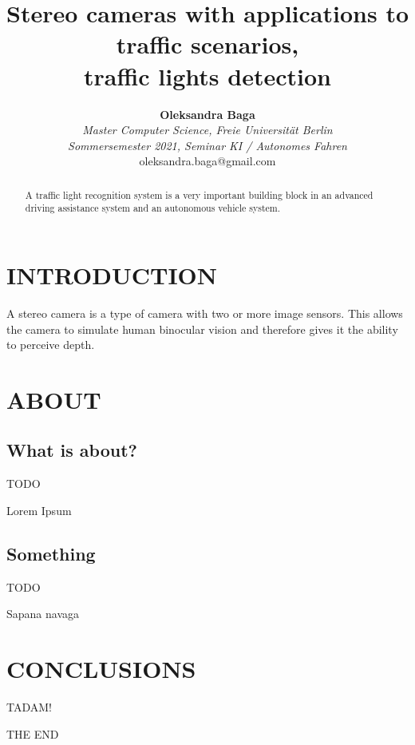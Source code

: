 \documentclass[letterpaper, 10 pt, conference]{ieeeconf}  %
\title{\LARGE \bf
Stereo cameras with applications to traffic scenarios,\\ traffic lights detection
}
\author{\textbf{Oleksandra Baga}\\ 
\textit{\small Master Computer Science, Freie Universit\"at Berlin}\\ 
\textit{\small Sommersemester 2021, Seminar KI / Autonomes Fahren}\\
{\small oleksandra.baga@gmail.com}}
\begin{document}
\maketitle

\thispagestyle{empty}
\pagestyle{empty}


\begin{abstract}

A traffic light recognition system is a very important building block in an advanced driving  assistance  system  and  an  autonomous  vehicle  system.

\end{abstract}


\section{INTRODUCTION}
A stereo camera is a type of camera with two or more image sensors. This allows the camera to simulate human binocular vision and therefore gives it the ability to perceive depth.


\section{ABOUT}
\subsection{What is about?}


TODO

Lorem Ipsum

\subsection{Something}

TODO

Sapana navaga

\section{CONCLUSIONS}
TADAM! 

THE END


\addtolength{\textheight}{-12cm}   %
\end{document}
